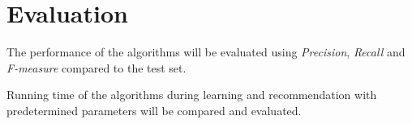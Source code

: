 
\section{Evaluation}\label{sec:method:eval}


The performance of the algorithms will be evaluated using \textit{Precision}, \textit{Recall} and \textit{F-measure} compared to the test set.

Running time of the algorithms during learning and recommendation with predetermined parameters will be compared and evaluated.
